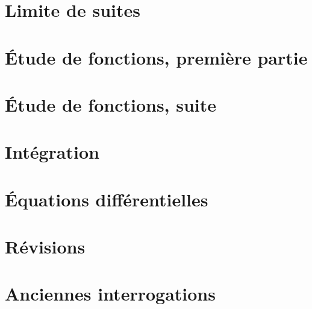 \section{Limite de suites}



\section{Étude de fonctions, première partie}


\section{Étude de fonctions, suite}


\section{Intégration}


\newpage

\section{Équations différentielles}


\section{Révisions}


\section{Anciennes interrogations}




